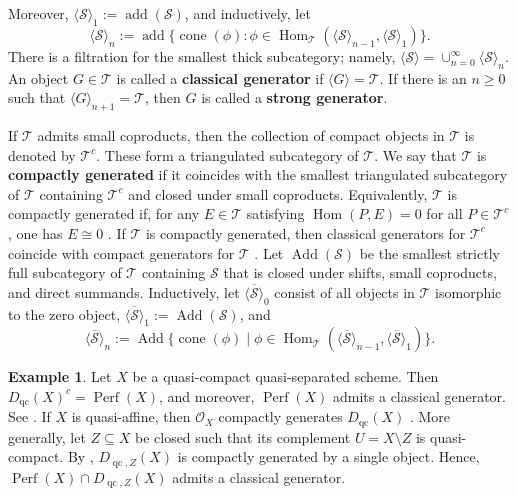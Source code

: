 \documentclass[11pt]{amsart}
\theoremstyle{plain}
\theoremstyle{definition}
\newtheorem{example}[theorem]{Example}
\numberwithin{equation}{section}
\numberwithin{theorem}{section}
\begin{document}
Moreover, $\langle \mathcal{S} \rangle_1 := \operatorname{add}(\mathcal{S})$, and inductively, let 
\begin{displaymath}
    \langle \mathcal{S} \rangle_n := \operatorname{add} \{ \operatorname{cone}(\phi) \colon \phi \in \operatorname{Hom}_{\mathcal{T}} (\langle \mathcal{S} \rangle_{n-1}, \langle \mathcal{S} \rangle_1) \}.
\end{displaymath}
There is a filtration for the smallest thick subcategory; namely, $\langle \mathcal{S} \rangle = \cup^\infty_{n=0} \langle \mathcal{S} \rangle_n$. 
An object $G\in \mathcal{T}$ is called a \textbf{classical generator} if $\langle G \rangle = \mathcal{T}$. 
If there is an $n\geq0$ such that $\langle G \rangle_{n+1} = \mathcal{T}$, then $G$ is called a \textbf{strong generator}.

If $\mathcal{T}$ admits small coproducts, then the collection of compact objects in $\mathcal{T}$ is denoted by $\mathcal{T}^c$. 
These form a triangulated subcategory of $\mathcal{T}$. 
We say that $\mathcal{T}$ is \textbf{compactly generated} if it coincides with the smallest triangulated subcategory of $\mathcal{T}$ containing $\mathcal{T}^c$ and closed under small coproducts. 
Equivalently, $\mathcal{T}$ is compactly generated if, for any $E \in \mathcal{T}$ satisfying $\operatorname{Hom}(P, E) = 0$ for all $P \in \mathcal{T}^c$, one has $E \cong 0$ \cite[Lemma 2.2.1]{Schwede/Shipley:2003}. 
If $\mathcal{T}$ is compactly generated, then classical generators for $\mathcal{T}^c$ coincide with compact generators for $\mathcal{T}$ \cite[\href{https://stacks.math.columbia.edu/tag/09SR}{Tag 09SR}]{stacks-project}. 
Let $\operatorname{Add}(\mathcal{S})$ be the smallest strictly full subcategory of $\mathcal{T}$ containing $\mathcal{S}$ that is closed under shifts, small coproducts, and direct summands. 
Inductively, let $\overline{\langle \mathcal{S} \rangle}_0$ consist of all objects in $\mathcal{T}$ isomorphic to the zero object, $\overline{\langle \mathcal{S} \rangle}_1 := \operatorname{Add}(\mathcal{S})$, and
\begin{displaymath}
    \overline{\langle \mathcal{S} \rangle}_n := \operatorname{Add} \{ \operatorname{cone}(\phi) \mid \phi \in \operatorname{Hom}_{\mathcal{T}} (\overline{\langle \mathcal{S} \rangle}_{n-1}, \overline{\langle \mathcal{S} \rangle}_1) \}.
\end{displaymath}

\begin{example}
    Let $X$ be a quasi-compact quasi-separated scheme. 
    Then $D_{\operatorname{qc}}(X)^c=\operatorname{Perf}(X)$, and moreover, $\operatorname{Perf}(X)$ admits a classical generator. 
    See \cite[Theorem 3.1.1]{Bondal/VandenBergh:2003}. 
    If $X$ is quasi-affine, then $\mathcal{O}_X$ compactly generates $D_{\operatorname{qc}}(X)$ \cite[\href{https://stacks.math.columbia.edu/tag/0BQT}{Tag 0BQT}]{stacks-project}.
    More generally, let $Z\subseteq X$ be closed such that its complement $U=X\setminus Z$ is quasi-compact.
    By \cite[Theorem 6.8]{Rouquier:2008}, $D_{\operatorname{qc},Z}(X)$ is compactly generated by a single object. 
    Hence, $\operatorname{Perf}(X)\cap D_{\operatorname{qc},Z}(X)$ admits a classical generator.
\end{example}
\end{document}
